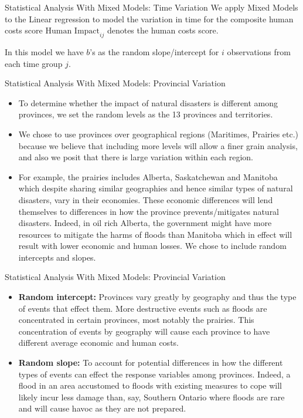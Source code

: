 \begin{frame}{Statistical Analysis With Mixed Models: Time Variation}
We apply Mixed Models to the Linear regression to model the variation in time for the composite human costs score $\text{Human Impact}_{ij}$ denotes the human costs score.

In this model we have $b$'s as the random slope/intercept for $i$ observations from each time group $j$.
\end{frame}

\begin{frame}{Statistical Analysis With Mixed Models: Provincial Variation}
	\begin{itemize}
		\item To determine whether the impact of natural disasters is different among provinces, we set the random levels as the 13 provinces and territories. 
		\item We chose to use provinces over geographical regions (Maritimes, Prairies etc.) because we believe that including more levels will allow a finer grain analysis, and also we posit that there is large variation within each region. 
		\item For example, the prairies includes Alberta, Saskatchewan and Manitoba which despite sharing similar geographies and hence similar types of natural disasters, vary in their economies. These economic differences will lend themselves to differences in how the province prevents/mitigates natural disasters. Indeed, in oil rich Alberta, the government might have more resources to mitigate the harms of floods than Manitoba which in effect will result with lower economic and human losses.  
		We chose to include random intercepts and slopes.
	\end{itemize}
\end{frame}

\begin{frame}{Statistical Analysis With Mixed Models: Provincial Variation}
\begin{itemize}

	\item \textbf{Random intercept: }Provinces vary greatly by geography and thus the type of events that effect them. More destructive events such as floods are concentrated in certain provinces, most notably the prairies. This concentration of events by geography will cause each province to have different average economic and human costs.
	\item \textbf{Random slope: }To account for potential differences in how the different types of events can effect the response variables among provinces. Indeed, a flood in an area accustomed to floods with existing measures to cope will likely incur less damage than, say, Southern Ontario where floods are rare and will cause havoc as they are not prepared.
\end{itemize}
\end{frame}

